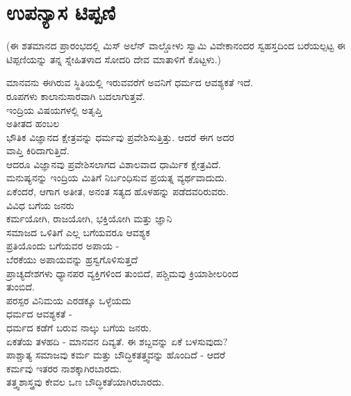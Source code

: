 
\chapter{ಉಪನ್ಯಾಸ ಟಿಪ್ಪಣಿ}

(ಈ ಶತಮಾನದ ಪ್ರಾರಂಭದಲ್ಲಿ ಮಿಸ್ ಅಲೆನ್ ವಾಲ್ಡೋಳು ಸ್ವಾಮಿ ವಿವೇಕಾನಂದರ ಸ್ವಹಸ್ತದಿಂದ ಬರೆಯಲ್ಪಟ್ಟ ಈ ಟಿಪ್ಪಣಿಯನ್ನು ತನ್ನ ಸ್ನೇಹಿತಳಾದ ಸೋದರಿ ದೇವ ಮಾತಾಳಿಗೆ ಕೊಟ್ಟಳು.)

\begin{myquote}
ಮಾನವನು ಈಗಿರುವ ಸ್ಥಿತಿಯಲ್ಲಿ ಇರುವವರೆಗೆ ಅವನಿಗೆ ಧರ್ಮದ ಆವಶ್ಯಕತೆ ಇದೆ.\\ರೂಪಗಳು ಕಾಲಾನುಸಾರವಾಗಿ ಬದಲಾಗುತ್ತವೆ.\\ಇಂದ್ರಿಯ ವಿಷಯಗಳಲ್ಲಿ ಅತೃಪ್ತಿ\\ಅತೀತದ ಹಂಬಲ\\ಭೌತಿಕ ವಿಜ್ಞಾನದ ಕ್ಷೇತ್ರವನ್ನು ಧರ್ಮವು ಪ್ರವೇಶಿಸುತ್ತಿತ್ತು. ಆದರೆ ಈಗ ಅದರ\\ವಾಪ್ತಿ ಕಿರಿದಾಗುತ್ತಿದೆ.\\ಆದರೂ ವಿಜ್ಞಾನವು ಪ್ರವೇಶಿಸಲಾಗದ ವಿಶಾಲವಾದ ಧಾರ್ಮಿಕ ಕ್ಷೇತ್ರವಿದೆ.\\ಮನುಷ್ಯನನ್ನು ಇಂದ್ರಿಯ ಮಿತಿಗೆ ನಿರ್ಬಂಧಿಸುವ ಪ್ರಯತ್ನ ವ್ಯರ್ಥವಾದುದು.\\ಏಕೆಂದರೆ, ಆಗಾಗ ಅತೀತ, ಅನಂತ ಸತ್ಯದ ಹೊಳಹನ್ನು ಪಡೆದವರಿರುವರು.\\ವಿವಿಧ ಬಗೆಯ ಜನರು\\ಕರ್ಮಯೋಗಿ, ರಾಜಯೋಗಿ, ಭಕ್ತಿಯೋಗಿ ಮತ್ತು ಜ್ಞಾನಿ\\ಸಮಾಜದ ಒಳಿತಿಗೆ ಎಲ್ಲ ಬಗೆಯವರೂ ಆವಶ್ಯಕ\\ಪ್ರತಿಯೊಂದು ಬಗೆಯವರ ಅಪಾಯ -\\ಬೆರಕೆಯು ಅಪಾಯವನ್ನು ಹ್ರಸ್ವಗೊಳಿಸುತ್ತದೆ\\ಪ್ರಾಚ್ಯದೇಶಗಳು ಧ್ಯಾನಪರ ವ್ಯಕ್ತಿಗಳಿಂದ ತುಂಬಿದೆ, ಪಶ್ಚಿಮವು ಕ್ರಿಯಾಶೀಲರಿಂದ\\ತುಂಬಿದೆ.\\ಪರಸ್ಪರ ವಿನಿಮಯ ಎರಡಕ್ಕೂ ಒಳ್ಳೆಯದು\\ಧರ್ಮದ ಆವಶ್ಯಕತೆ -\\ಧರ್ಮದ ಕಡೆಗೆ ಬರುವ ನಾಲ್ಕು ಬಗೆಯ ಜನರು.\\ಏಕತೆಯ ತಳಹದಿ - ಮಾನವನ ದಿವ್ಯತೆ. ಈ ಶಬ್ದವನ್ನು ಏಕೆ ಬಳಸುವುದು?\\ಪಾಶ್ಚಾತ್ಯ ಸಮಾಜವು ಕರ್ಮ ಮತ್ತು ಬೌದ್ಧಿಕತತ್ತ್ವವನ್ನು ಹೊಂದಿದೆ - ಆದರೆ\\ಕರ್ಮವು ಇತರರ ನಾಶಕ್ಕಾಗಿರಬಾರದು.\\ತತ್ತ್ವಶಾಸ್ತ್ರವು ಕೇವಲ ಒಣ ಬೌದ್ಧಿಕತೆಯಾಗಿರಬಾರದು.
\end{myquote}

